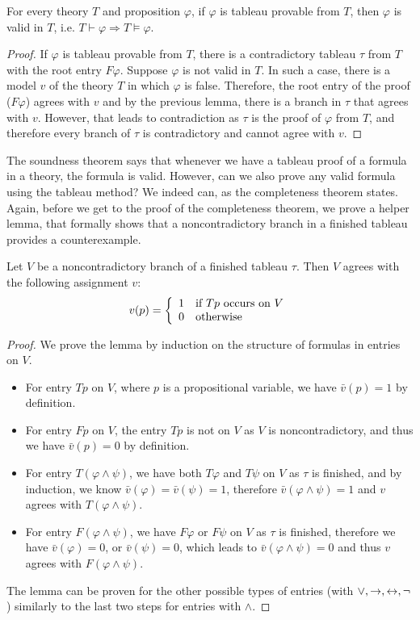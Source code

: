 \begin{theorem}
For every theory $T$ and proposition $\varphi$, if $\varphi$ is tableau provable from $T$, then $\varphi$ is valid in $T$, i.e. $T \vdash \varphi \Rightarrow T \vDash \varphi$.
\end{theorem}
\begin{proof}
If $\varphi$ is tableau provable from $T$, there is a contradictory tableau $\tau$ from $T$ with the root entry $F \varphi$. Suppose $\varphi$ is not valid in $T$. In such a case, there is a model $v$ of the theory $T$ in which $\varphi$ is false. Therefore, the root entry of the proof ($F \varphi$) agrees with $v$ and by the previous lemma, there is a branch in $\tau$ that agrees with $v$. However, that leads to contradiction as $\tau$ is the proof of $\varphi$ from $T$, and therefore every branch of $\tau$ is contradictory and cannot agree with $v$.
\end{proof}

The soundness theorem says that whenever we have a tableau proof of a formula in a theory, the formula is valid. However, can we also prove any valid formula using the tableau method? We indeed can, as the completeness theorem states. Again, before we get to the proof of the completeness theorem, we prove a helper lemma, that formally shows that a noncontradictory branch in a finished tableau provides a counterexample.

\begin{lemma}
Let $V$ be a noncontradictory branch of a finished tableau $\tau$. Then $V$ agrees with the following assignment $v$: $$v(p) = \left\{ \begin{array}{ll} 1 & \text{if } Tp \text{ occurs on } V \\ 0 & \text{otherwise} \end{array} \right.$$
\end{lemma}
\begin{proof}
We prove the lemma by induction on the structure of formulas in entries on $V$.
\begin{itemize}
 \item For entry $T p$ on $V$, where $p$ is a propositional variable, we have $\bar{v}(p)= 1$ by definition.
 \item For entry $F p$ on $V$, the entry $T p$ is not on $V$ as $V$ is noncontradictory, and thus we have $\bar{v}(p) = 0$ by definition.
 \item For entry $T (\varphi \land \psi)$, we have both $T \varphi$ and $T \psi$ on $V$ as $\tau$ is finished, and by induction, we know $\bar{v}(\varphi)=\bar{v}(\psi)=1$, therefore $\bar{v}(\varphi \land \psi)=1$ and $v$ agrees with $T (\varphi \land \psi)$.
 \item For entry $F (\varphi \land \psi)$, we have $F \varphi$ or $F \psi$ on $V$ as $\tau$ is finished, therefore we have $\bar{v}(\varphi) = 0$, or $\bar{v}(\psi) = 0$, which leads to $\bar{v}(\varphi \land \psi) = 0$ and thus $v$ agrees with $F (\varphi \land \psi)$.
\end{itemize}

The lemma can be proven for the other possible types of entries (with $\lor, \to, \leftrightarrow, \neg$) similarly to the last two steps for entries with $\land$.
\end{proof}

